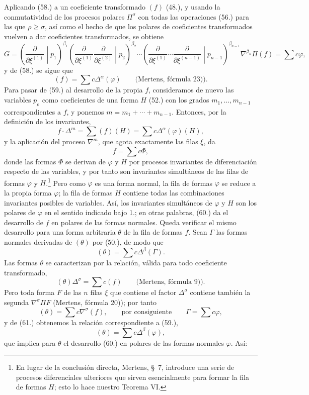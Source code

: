 \documentclass[11pt]{article}
\begin{document}
Aplicando (58.) a un coeficiente transformado $(f)$ (48.), y usando la conmutatividad de los procesos polares $\Pi^\sigma$ con todas las operaciones (56.) para las que $\rho\ge\sigma$, así como el hecho de que los polares de coeficientes transformados vuelven a dar coeficientes transformados, se obtiene
\[
 G=\left(\frac{\partial}{\partial\xi^{(1)}}\middle|p_1\right)^{\beta_1}
 \left(\frac{\partial}{\partial\xi^{(1)}}\frac{\partial}{\partial\xi^{(2)}}\middle|p_2\right)^{\beta_2}
 \cdots
 \left(\frac{\partial}{\partial\xi^{(1)}}\cdots\frac{\partial}{\partial\xi^{(n-1)}}\middle|p_{n-1}\right)^{\beta_{n-1}}
 \nabla^{\beta_n}\Pi(f)=\sum c\varphi,
\]
y de (58.) se sigue que
\begin{equation}
 (f)=\sum c\Delta^\alpha(\varphi)\qquad\text{(Mertens, fórmula 23)).}
\tag{59}
\end{equation}
Para pasar de (59.) al desarrollo de la propia $f$, consideramos de nuevo las variables $p_\rho$ como coeficientes de una forma $H$ (52.) con los grados $m_1,\ldots,m_{n-1}$ correspondientes a $f$, y ponemos $m=m_1+\cdots+m_{n-1}$. Entonces, por la definición de los invariantes,
\[
 f\cdot\Delta^m=\sum(f)(H)=\sum c\Delta^\alpha(\varphi)(H),
\]
y la aplicación del proceso $\nabla^m$, que agota exactamente las filas $\xi$, da
\begin{equation}
 f=\sum c\Phi,
\tag{60}
\end{equation}
donde las formas $\Phi$ se derivan de $\varphi$ y $H$ por procesos invariantes de diferenciación respecto de las variables, y por tanto son invariantes simultáneos de las filas de formas $\varphi$ y $H$.\footnote{En lugar de la conclusión directa, Mertens, \S\ 7, introduce una serie de procesos diferenciales ulteriores que sirven esencialmente para formar la fila de formas $H$; esto lo hace nuestro Teorema VI.} Pero como $\varphi$ es una forma normal, la fila de formas $\varphi$ se reduce a la propia forma $\varphi$; la fila de formas $H$ contiene todas las combinaciones invariantes posibles de variables. Así, los invariantes simultáneos de $\varphi$ y $H$ son los polares de $\varphi$ en el sentido indicado bajo 1.; en otras palabras, (60.) da el desarrollo de $f$ en polares de las formas normales. Queda verificar el mismo desarrollo para una forma arbitraria $\theta$ de la fila de formas $f$. Sean $\Gamma$ las formas normales derivadas de $(\theta)$ por (50.), de modo que
\begin{equation}
 (\theta)=\sum c\Delta^\beta(\Gamma).
\tag{61}
\end{equation}
Las formas $\theta$ se caracterizan por la relación, válida para todo coeficiente transformado,
\[
 (\theta)\Delta^\sigma=\sum c(f)\qquad\text{(Mertens, fórmula 9)).}
\]
Pero toda forma $F$ de las $n$ filas $\xi$ que contiene el factor $\Delta^\sigma$ contiene también la segunda $\nabla^\sigma\Pi F$ (Mertens, fórmula 20)); por tanto
\[
 (\theta)=\sum c\nabla^\sigma(f),\qquad\text{por consiguiente}\qquad \Gamma=\sum c\varphi,
\]
y de (61.) obtenemos la relación correspondiente a (59.),
\[
 (\theta)=\sum c\Delta^\beta(\varphi),
\]
que implica para $\theta$ el desarrollo (60.) en polares de las formas normales $\varphi$. Así:
\end{document}
